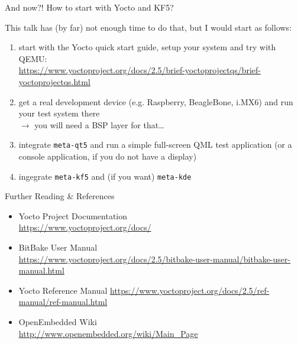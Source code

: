 \documentclass[ucs,9pt]{beamer}
\begin{document}
\begin{frame}
    {And now?!}
    {How to start with Yocto and KF5?}

    This talk has (by far) not enough time to do that, but I would start as follows:

    \begin{enumerate}
        \item start with the Yocto quick start guide, setup your system and try with QEMU:\\
            \url{https://www.yoctoproject.org/docs/2.5/brief-yoctoprojectqs/brief-yoctoprojectqs.html}
        \item get a real development device (e.g. Raspberry, BeagleBone, i.MX6) and run your test system there\\
            $\rightarrow$ you will need a BSP layer for that\dots
        \item integrate \texttt{meta-qt5} and run a simple full-screen QML test application (or a console application, if you do not have a display)
        \item ingegrate \texttt{meta-kf5} and (if you want) \texttt{meta-kde}
    \end{enumerate}

\end{frame}


\begin{frame}
    {Further Reading \& References}
    \begin{itemize}
        \item Yocto Project Documentation\\
            \url{https://www.yoctoproject.org/docs/}
        \item BitBake User Manual\\
            \url{https://www.yoctoproject.org/docs/2.5/bitbake-user-manual/bitbake-user-manual.html}
        \item Yocto Reference Manual
            \url{https://www.yoctoproject.org/docs/2.5/ref-manual/ref-manual.html}
        \item OpenEmbedded Wiki\\
            \url{http://www.openembedded.org/wiki/Main_Page}
    \end{itemize}
\end{frame}

\KDElastframe
\end{document}
